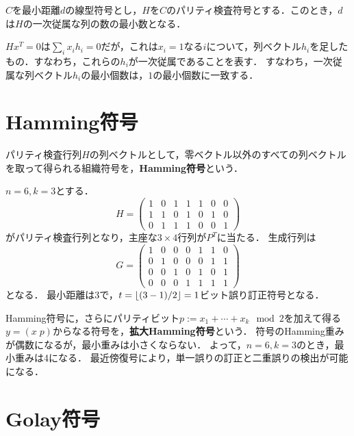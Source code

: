 \documentclass[uplatex,dvipdfmx]{jsreport}
\begin{document}
\begin{theorem}
    $C$を最小距離$d$の線型符号とし，$H$を$C$のパリティ検査符号とする．このとき，$d$は$H$の一次従属な列の数の最小数となる．
\end{theorem}
\begin{remarks}
    $Hx^T=0$は$\sum_ix_ih_i=0$だが，これは$x_i=1$なる$i$について，列ベクトル$h_i$を足したもの．すなわち，これらの$h_i$が一次従属であることを表す．
    すなわち，一次従属な列ベクトル$h_i$の最小個数は，$1$の最小個数に一致する．
\end{remarks}

\section{Hamming符号}

\begin{definition}
    パリティ検査行列$H$の列ベクトルとして，零ベクトル以外のすべての列ベクトルを取って得られる組織符号を，\textbf{Hamming符号}という．
\end{definition}
\begin{example}
    $n=6,k=3$とする．
    \[H=\begin{pmatrix}1&0&1&1&1&0&0\\1&1&0&1&0&1&0\\0&1&1&1&0&0&1\end{pmatrix}\]
    がパリティ検査行列となり，主座な$3\times 4$行列が$P^T$に当たる．
    生成行列は
    \[G=\begin{pmatrix}1&0&0&0&1&1&0\\0&1&0&0&0&1&1\\0&0&1&0&1&0&1\\0&0&0&1&1&1&1\end{pmatrix}\]
    となる．
    最小距離は3で，$t=\lfloor(3-1)/2\rfloor=1$ビット誤り訂正符号となる．
\end{example}

\begin{definition}
    Hamming符号に，さらにパリティビット$p:=x_1+\cdots+x_k\mod 2$を加えて得る$y=(x\;p)$からなる符号を，\textbf{拡大Hamming符号}という．
    符号のHamming重みが偶数になるが，最小重みは小さくならない．
    よって，$n=6,k=3$のとき，最小重みは4になる．
    最近傍復号により，単一誤りの訂正と二重誤りの検出が可能になる．
\end{definition}

\section{Golay符号}
\end{document}
